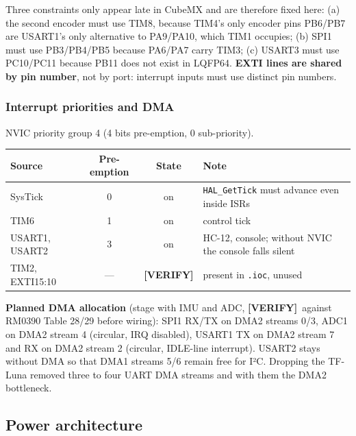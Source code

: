 \documentclass[11pt,a4paper]{article}
\newcommand{\mk}[2]{\textsf{\scriptsize\bfseries\colorbox{#1bg}{\color{#1}[#2]}}}
\newcommand{\VERIFY}{\mk{cold}{VERIFY}}
\newcommand{\code}[1]{\texttt{\small #1}}
\begin{document}
Three constraints only appear late in CubeMX and are therefore fixed here:
(a) the second encoder must use TIM8, because TIM4's only encoder pins PB6/PB7
are USART1's only alternative to PA9/PA10, which TIM1 occupies; (b) SPI1 must
use PB3/PB4/PB5 because PA6/PA7 carry TIM3; (c) USART3 must use PC10/PC11
because PB11 does not exist in LQFP64. \textbf{EXTI lines are shared by pin
number}, not by port: interrupt inputs must use distinct pin numbers.

\subsubsection{Interrupt priorities and DMA}

NVIC priority group 4 (4 bits pre-emption, 0 sub-priority).

\begin{center}
\small
\begin{tabular}{@{}lccl@{}}
\toprule
\textbf{Source} & \textbf{Pre-emption} & \textbf{State} & \textbf{Note}\\
\midrule
SysTick        & 0 & on & \code{HAL\_GetTick} must advance even inside ISRs\\
TIM6           & 1 & on & control tick\\
USART1, USART2 & 3 & on & HC-12, console; without NVIC the console falls silent\\
TIM2, EXTI15:10 & --- & \VERIFY & present in \code{.ioc}, unused\\
\bottomrule
\end{tabular}
\end{center}

\textbf{Planned DMA allocation} (stage with IMU and ADC, \VERIFY\ against
RM0390 Table 28/29 before wiring): SPI1 RX/TX on DMA2 streams 0/3, ADC1 on DMA2
stream 4 (circular, IRQ disabled), USART1 TX on DMA2 stream 7 and RX on DMA2
stream 2 (circular, IDLE-line interrupt). USART2 stays without DMA so that
DMA1 streams 5/6 remain free for I²C. Dropping the TF-Luna removed three to
four UART DMA streams and with them the DMA2 bottleneck.

\subsection{Power architecture}\label{sec:power}
\end{document}
